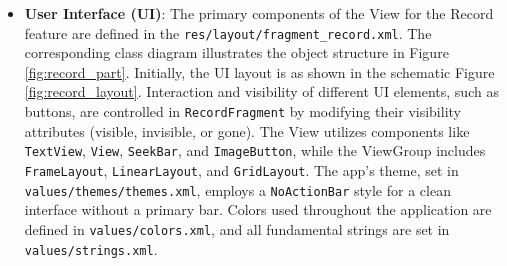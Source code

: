 \documentclass[conference,10pt,letterpaper]{IEEEtran}
\begin{document}
	\begin{itemize}
		\item \textbf{User Interface (UI)}: 
		The primary components of the View for the Record feature are defined in the \texttt{res/layout/fragment\_record.xml}. The corresponding class diagram illustrates the object structure in Figure \ref{fig:record_part}. Initially, the UI layout is as shown in the schematic Figure \ref{fig:record_layout}. Interaction and visibility of different UI elements, such as buttons, are controlled in \texttt{RecordFragment} by modifying their visibility attributes (visible, invisible, or gone). The View utilizes components like \texttt{TextView}, \texttt{View}, \texttt{SeekBar}, and \texttt{ImageButton}, while the ViewGroup includes \texttt{FrameLayout}, \texttt{LinearLayout}, and \texttt{GridLayout}. The app's theme, set in \texttt{values/themes/themes.xml}, employs a \texttt{NoActionBar} style for a clean interface without a primary bar. Colors used throughout the application are defined in \texttt{values/colors.xml}, and all fundamental strings are set in \texttt{values/strings.xml}.
		

\end{itemize}
\end{document}
